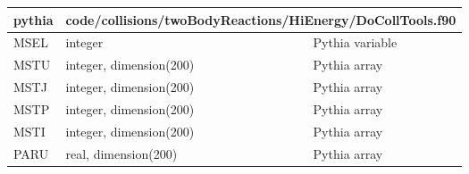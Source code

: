\documentclass{article}
\begin{document}
\begin{longtable}{llll}
\toprule
\textbf{\large{pythia}} & \multicolumn{3}{l}{\footnotesize{code/collisions/twoBodyReactions/HiEnergy/DoCollTools.f90}}\\*
\midrule
\endfirsthead
\midrule
\endhead
MSEL & \begin{minipage}[t]{2cm}integer\end{minipage} & \begin{minipage}[t]{2cm}\end{minipage} & \begin{minipage}[t]{12cm}Pythia variable\end{minipage}\\*
\midrule
MSTU & \begin{minipage}[t]{2cm}integer, dimension(200)\end{minipage} & \begin{minipage}[t]{2cm}\end{minipage} & \begin{minipage}[t]{12cm}Pythia array\end{minipage}\\*
\midrule
MSTJ & \begin{minipage}[t]{2cm}integer, dimension(200)\end{minipage} & \begin{minipage}[t]{2cm}\end{minipage} & \begin{minipage}[t]{12cm}Pythia array\end{minipage}\\*
\midrule
MSTP & \begin{minipage}[t]{2cm}integer, dimension(200)\end{minipage} & \begin{minipage}[t]{2cm}\end{minipage} & \begin{minipage}[t]{12cm}Pythia array\end{minipage}\\*
\midrule
MSTI & \begin{minipage}[t]{2cm}integer, dimension(200)\end{minipage} & \begin{minipage}[t]{2cm}\end{minipage} & \begin{minipage}[t]{12cm}Pythia array\end{minipage}\\*
\midrule
PARU & \begin{minipage}[t]{2cm}real, dimension(200)\end{minipage} & \begin{minipage}[t]{2cm}\end{minipage} & \begin{minipage}[t]{12cm}Pythia array\end{minipage}\\*

\end{longtable}
\end{document}
